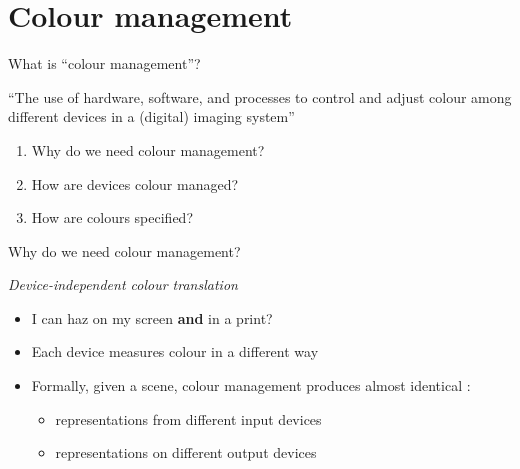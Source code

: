 \documentclass[aspectratio=169]{fireshonks}
\begin{document}
\section{Colour management}
\begin{frame}{What is \enquote{colour management}?}
  \begin{definition}
    \enquote{The use of hardware, software, and processes to control and adjust colour among different devices in a (digital) imaging system} \autocite{sharma}
  \end{definition}

  \begin{enumerate}
    \item Why do we need colour management?
    \item How are devices colour managed?
    \item How are colours specified?
  \end{enumerate}
\end{frame}
\begin{frame}{Why do we need colour management?}
  \begin{center}
    \emph{Device-independent colour translation}
  \end{center}

  \begin{itemize}[<+(1)->]
    \item {} I can haz \colorbox{baseColor3}{\phantom{AKI}} on my screen \textbf{and} in a print?
    \item Each device measures colour in a different way
    \item Formally, given a scene, colour management produces almost identical \autocite{allen}:
          \begin{itemize}
            \item representations from different input devices
            \item representations on different output devices
          \end{itemize}
  \end{itemize}
\end{frame}
\end{document}
